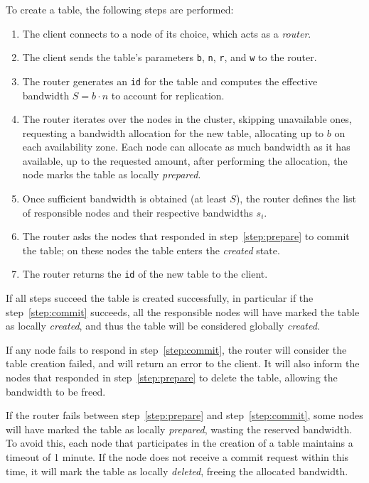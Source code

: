 To create a table, the following steps are performed:
\begin{enumerate}
    \item The client connects to a node of its choice, which acts as a
        \emph{router}.
    \item The client sends the table's parameters \texttt{b}, \texttt{n},
        \texttt{r}, and \texttt{w} to the router.
    \item The router generates an \texttt{id} for the table and computes the
        effective bandwidth $S = b \cdot n$ to account for replication.
    \item\label{step:prepare} The router iterates over the nodes in the
        cluster, skipping unavailable ones, requesting a bandwidth allocation
        for the new table, allocating up to $b$ on each availability zone.
        Each node can allocate as much bandwidth as it has available, up to the
        requested amount, after performing the allocation, the node marks the
        table as locally \emph{prepared}.
    \item Once sufficient bandwidth is obtained (at least $S$), the router
        defines the list of responsible nodes and their respective bandwidths
        $s_i$.
    \item\label{step:commit} The router asks the nodes that responded in
        step~\ref{step:prepare} to commit the table; on these nodes the table
        enters the \emph{created} state.
    \item The router returns the \texttt{id} of the new table to the client.
\end{enumerate}

If all steps succeed the table is created successfully, in particular if the
step~\ref{step:commit} succeeds, all the responsible nodes will have marked the
table as locally \emph{created}, and thus the table will be considered globally
\emph{created}.

If any node fails to respond in step~\ref{step:commit}, the router will
consider the table creation failed, and will return an error to the client.
It will also inform the nodes that responded in step~\ref{step:prepare} to
delete the table, allowing the bandwidth to be freed.

If the router fails between step~\ref{step:prepare} and step~\ref{step:commit},
some nodes will have marked the table as locally \emph{prepared}, wasting the
reserved bandwidth.
To avoid this, each node that participates in the creation of a table maintains
a timeout of 1 minute.
If the node does not receive a commit request within this time, it will mark
the table as locally \emph{deleted}, freeing the allocated bandwidth.

